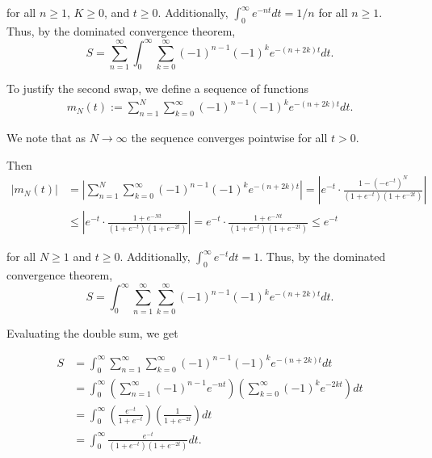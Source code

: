 \documentclass{article}
\begin{document}
 for all $n\geq1$, $K \geq 0$, and $t\geq0$. Additionally, $\int_0^{\infty}e^{-nt}dt=1/n$ for all $n\geq1$. Thus, by the dominated convergence theorem, 
\begin{equation*}
    S=\sum_{n=1}^{\infty}\int_{0}^{\infty}\sum_{k=0}^{\infty}(-1)^{n-1}(-1)^ke^{-(n+2k)t}dt.
\end{equation*}
 

\vspace{5mm}

To justify the second swap, we define a sequence of functions
\begin{align*}
    m_{N}(t):=\sum_{n=1}^{N}\sum_{k=0}^{\infty}(-1)^{n-1}(-1)^ke^{-(n+2k)t}dt.
\end{align*}

We note that as $N \to \infty$ the sequence converges pointwise for all $t>0$.

\vspace{5mm}

Then 
\begin{align*}
    |m_N(t)|&=\left|\sum_{n=1}^{N}\sum_{k=0}^{\infty}(-1)^{n-1}(-1)^ke^{-(n+2k)t}\right| = \left|e^{-t}\cdot\frac{1-(-e^{-t})^N}{(1+e^{-t})(1+e^{-2t})}\right|\\ &\leq \left|e^{-t}\cdot   \frac{1+e^{-Nt}}{(1+e^{-t})(1+e^{-2t})}\right| = e^{-t}\cdot   \frac{1+e^{-Nt}}{(1+e^{-t})(1+e^{-2t})} \leq  e^{-t}
\end{align*}

for all $N \geq 1$ and $t\geq0$. Additionally, $\int_0^{\infty}e^{-t}dt=1$. Thus, by the dominated convergence theorem, 
\begin{equation*}
    S=\int_{0}^{\infty}\sum_{n=1}^{\infty}\sum_{k=0}^{\infty}(-1)^{n-1}(-1)^ke^{-(n+2k)t}dt.
\end{equation*}

\vspace{5mm}

Evaluating the double sum, we get

\begin{align*}
    S &= \int_{0}^{\infty}\sum_{n=1}^{\infty}\sum_{k=0}^{\infty}(-1)^{n-1}(-1)^ke^{-(n+2k)t}dt \\
    &= \int_{0}^{\infty}\left(\sum_{n=1}^{\infty}(-1)^{n-1}e^{-nt}\right)\left(\sum_{k=0}^{\infty}(-1)^ke^{-2kt}\right)dt \\
    &=\int_{0}^{\infty}\left(\frac{e^{-t}}{1+e^{-t}}\right)\left(\frac{1}{1+e^{-2t}}\right)dt \\
    &= \int_{0}^{\infty}\frac{e^{-t}}{(1+e^{-t})(1+e^{-2t})}dt.
\end{align*}
\end{document}
